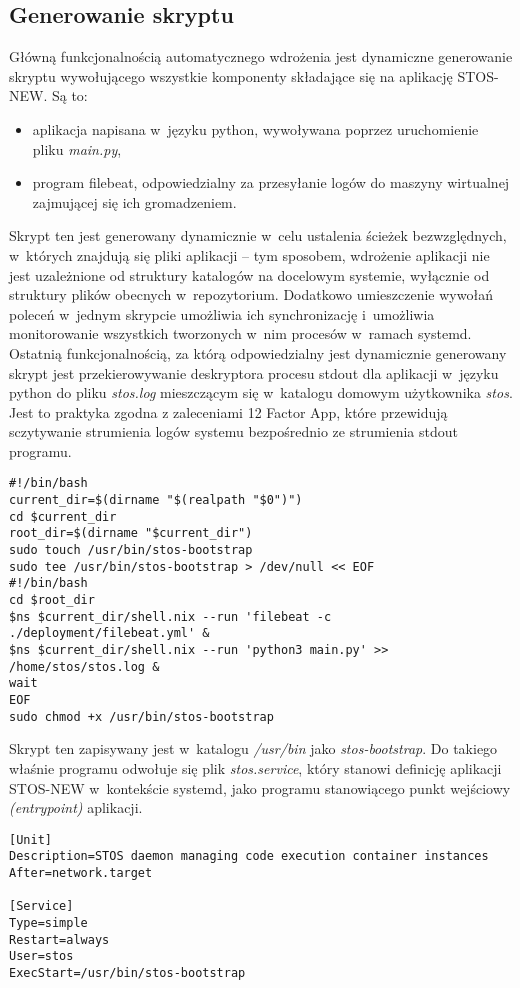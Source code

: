 \subsection{Generowanie skryptu}
Główną funkcjonalnością automatycznego wdrożenia jest dynamiczne generowanie skryptu wywołującego wszystkie komponenty składające się na aplikację STOS-NEW. Są to:
\begin{itemize}
	\item aplikacja napisana w~języku python, wywoływana poprzez uruchomienie pliku \textit{main.py},
	\item program filebeat, odpowiedzialny za przesyłanie logów do maszyny wirtualnej zajmującej się ich gromadzeniem.
\end{itemize}
Skrypt ten jest generowany dynamicznie w~celu ustalenia ścieżek bezwzględnych, w~których znajdują się pliki aplikacji -- tym sposobem, wdrożenie aplikacji nie jest uzależnione od struktury katalogów na docelowym systemie, wyłącznie od struktury plików obecnych w~repozytorium. Dodatkowo umieszczenie wywołań poleceń w~jednym skrypcie umożliwia ich synchronizację i~umożliwia monitorowanie wszystkich tworzonych w~nim procesów w~ramach systemd. Ostatnią funkcjonalnością, za którą odpowiedzialny jest dynamicznie generowany skrypt jest przekierowywanie deskryptora procesu stdout dla aplikacji w~języku python do pliku \textit{stos.log} mieszczącym się w~katalogu domowym użytkownika \textit{stos}. Jest to praktyka zgodna z zaleceniami 12 Factor App, które przewidują sczytywanie strumienia logów systemu bezpośrednio ze strumienia stdout programu\cite{12fa}.
\lstset{style=shell}
\begin{lstlisting}[caption = {Dynamiczne generowanie skryptu uruchamiającego aplikację STOS, uwzględniającego ścieżki bezwzlędne, w~których znajdują się pliki źródłowe aplikacji}]
#!/bin/bash
current_dir=$(dirname "$(realpath "$0")")
cd $current_dir
root_dir=$(dirname "$current_dir")
sudo touch /usr/bin/stos-bootstrap
sudo tee /usr/bin/stos-bootstrap > /dev/null << EOF
#!/bin/bash
cd $root_dir
$ns $current_dir/shell.nix --run 'filebeat -c ./deployment/filebeat.yml' &
$ns $current_dir/shell.nix --run 'python3 main.py' >> /home/stos/stos.log &
wait
EOF
sudo chmod +x /usr/bin/stos-bootstrap
\end{lstlisting}
Skrypt ten zapisywany jest w~katalogu \textit{/usr/bin} jako \textit{stos-bootstrap}. Do takiego właśnie programu odwołuje się plik \textit{stos.service}, który stanowi definicję aplikacji STOS-NEW w~kontekście systemd, jako programu stanowiącego punkt wejściowy \textit{(entrypoint)} aplikacji.
\begin{lstlisting}[caption = {Definicja aplikacji STOS-NEW jako serwisu w~kontekście systemd}]
[Unit]
Description=STOS daemon managing code execution container instances
After=network.target

[Service]
Type=simple
Restart=always
User=stos
ExecStart=/usr/bin/stos-bootstrap
\end{lstlisting}
